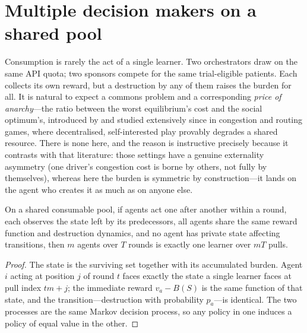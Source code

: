 
\section{Multiple decision makers on a shared pool}
\label{sec:multiagent}

Consumption is rarely the act of a single learner. Two orchestrators draw on the
same API quota; two sponsors compete for the same trial-eligible patients. Each
collects its own reward, but a destruction by any of them raises the burden for
all. It is natural to expect a commons problem and a corresponding
\emph{price of anarchy}---the ratio between the worst equilibrium's cost and the
social optimum's, introduced by \citet{koutsoupias1999}
and studied extensively since in congestion and routing games, where
decentralised, self-interested play provably degrades a shared resource. There
is none here, and the reason is instructive precisely because it contrasts with
that literature: those settings have a genuine externality asymmetry (one
driver's congestion cost is borne by others, not fully by themselves), whereas
here the burden is symmetric by construction---it lands on the agent who
creates it as much as on anyone else.

\begin{theorem}
\label{thm:seqequiv}
On a shared consumable pool, if agents act one after another within a round,
each observes the state left by its predecessors, all agents share the same
reward function and destruction dynamics, and no agent has private state
affecting transitions, then $m$ agents over $T$ rounds
is exactly one learner over $mT$ pulls.
\end{theorem}

\begin{proof}
The state is the surviving set together with its accumulated burden. Agent $i$
acting at position $j$ of round $t$ faces exactly the state a single learner faces
at pull index $tm+j$; the immediate reward $v_a - B(S)$ is the same function of
that state, and the transition---destruction with probability $p_a$---is identical.
The two processes are the same Markov decision process, so any policy in one
induces a policy of equal value in the other.
\end{proof}

